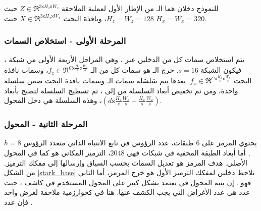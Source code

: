 للنموذج دخلان هما الـ
 من الإطار الأول لعملية الملاحقة 
$Z \in \Re^{{3} \mathsf{x} {H_z} \mathsf{x} W_z}$
حيث 
$H_z = W_z = 128$،
ونافذة البحث 
$X \in \Re^{{3} \mathsf{x} {H_x} \mathsf{x} W_x}$
حيث
$H_x = W_x = 320$.
\subsubsection{المرحلة الأولى - استخلاص السمات}
يتم استخلاص سمات كل من الدخلين عبر 
،
 وهي المراحل الأربعة الأولى من شبكة
،
فيكون
 الشبكة 
 $s = 16$.
\newline
 خرج الـ
 هو سمات كل من الـ
$f_z \in \Re^{C \mathsf{x} \frac{H_z}{s} \mathsf{x} \frac{W_z}{s}}$،
وسمات نافذة البحث
$f_x \in \Re^{C \mathsf{x} \frac{H_x}{s} \mathsf{x} \frac{W_x}{s}}$.
بعدها  يتم سَلسَلة
 سمات الـ
وسمات نافذة البحث ضمن سلسلة واحدة، ومن ثم تخفيض أبعاد السلسلة من 
إلى
، ثم تسطيح 
 السلسلة لتصبح بأبعاد
$( d \mathsf{x} \frac{H_z}{s}\frac{W_z}{s} + \frac{H_x}{s}\frac{W_x}{s} )$،
وهذه السلسلة هي دخل المحول.
\subsubsection{المرحلة الثانية - المحول}
يحتوي المرمز على $6$ طبقات، عدد الرؤوس في تابع الانتباه الذاتي متعدد الرؤوس
$ h=8 $,
أما أبعاد الطبقة المخفية  في شبكات 
فهي
 $2048$،
الترميز المكاني هو 
كما في المحول الأصلي.
\newline
هدف  المرمز هو تعديل السمات بحسب السياق وإرسالها إلى مفكك الترميز.
من الشكل
\ref{stark_base}
نلاحظ دخلين لمفكك الترميز
الأول هو خرج المرمز، أما الثاني فهو
.
إن بنية المحول في
تعتمد بشكل كبير على المحول المستخدم في كاشف
،
حيث عدد
هي عدد الأغراض التي يجب الكشف عنها. هنا في 
كخوارزمية ملاحقة لغرض واحد فإن عدد 
.
